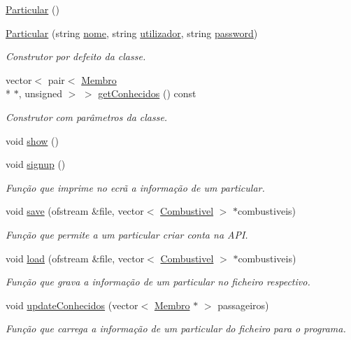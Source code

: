 \begin{DoxyCompactItemize}
\item 
\hyperlink{class_particular_ac348d7cd078bbc184cf12f7ac8c7e589}{Particular} ()
\item 
\hyperlink{class_particular_a00248cda34d52ac67b531ca3f71d557d}{Particular} (string \hyperlink{class_membro_a2598bbe34ae32a98f41468b2202a9555}{nome}, string \hyperlink{class_membro_a42cc733ff94ec8d1bbfdacc62dfbb0e7}{utilizador}, string \hyperlink{class_membro_ae2b12fc3e91efc674c07e735edf4ac21}{password})
\begin{DoxyCompactList}\small\item\em Construtor por defeito da classe. \end{DoxyCompactList}\item 
vector$<$ pair$<$ \hyperlink{class_membro}{Membro} \\*
$\ast$, unsigned $>$ $>$ \hyperlink{class_particular_a4449ee915348f09a2c5b96f3f8106a55}{get\+Conhecidos} () const 
\begin{DoxyCompactList}\small\item\em Construtor com parâmetros da classe. \end{DoxyCompactList}\item 
void \hyperlink{class_particular_a01235e9f582726e6068b176cd4b8795b}{show} ()
\item 
void \hyperlink{class_particular_aa8459c54108da82bb5ae21f2779c53da}{signup} ()
\begin{DoxyCompactList}\small\item\em Função que imprime no ecrã a informação de um particular. \end{DoxyCompactList}\item 
void \hyperlink{class_particular_a3925d68794b2e91a9c46346e5110b013}{save} (ofstream \&file, vector$<$ \hyperlink{class_combustivel}{Combustivel} $>$ $\ast$combustiveis)
\begin{DoxyCompactList}\small\item\em Função que permite a um particular criar conta na A\+P\+I. \end{DoxyCompactList}\item 
void \hyperlink{class_particular_a1da22ddfc6b6fc1c562cf4dcdc649e2a}{load} (ofstream \&file, vector$<$ \hyperlink{class_combustivel}{Combustivel} $>$ $\ast$combustiveis)
\begin{DoxyCompactList}\small\item\em Função que grava a informação de um particular no ficheiro respectivo. \end{DoxyCompactList}\item 
void \hyperlink{class_particular_a544f2ee62236cd4734aa6a7e9848fbae}{update\+Conhecidos} (vector$<$ \hyperlink{class_membro}{Membro} $\ast$ $>$ passageiros)
\begin{DoxyCompactList}\small\item\em Função que carrega a informação de um particular do ficheiro para o programa. \end{DoxyCompactList}\end{DoxyCompactItemize}
